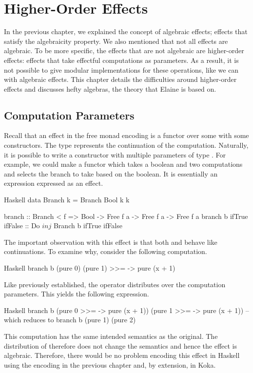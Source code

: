 \chapter{Higher-Order Effects}\label{chap:higher_order}

In the previous chapter, we explained the concept of algebraic effects; effects that satisfy the algebraicity property. We also mentioned that not all effects are algebraic. To be more specific, the effects that are not algebraic are higher-order effects: effects that take effectful computations as parameters. As a result, it is not possible to give modular implementations for these operations, like we can with algebraic effects. This chapter details the difficulties around higher-order effects and discusses hefty algebras, the theory that Elaine is based on.


\section{Computation Parameters}

Recall that an effect in the free monad encoding is a functor over some  with some constructors. The type  represents the continuation of the computation. Naturally, it is possible to write a constructor with multiple parameters of type . For example, we could make a  functor which takes a boolean and two computations and selects the branch to take based on the boolean. It is essentially an  expression expressed as an effect.

\begin{lst}{Haskell}
data Branch k = Branch Bool k k

branch :: Branch < f => Bool -> Free f a -> Free f a -> Free f a
branch b ifTrue ifFalse :: Do $ inj $ Branch b ifTrue ifFalse
\end{lst}
%
The important observation with this effect is that both  and  behave like continuations. To examine why, consider the following computation.

\begin{lst}{Haskell}
branch b (pure 0) (pure 1) >>= \x -> pure (x + 1)
\end{lst}
%
Like previously established, the \hs{>>=} operator distributes over the computation parameters. This yields the following expression.

\begin{lst}{Haskell}
branch b
  (pure 0 >>= \x -> pure (x + 1))
  (pure 1 >>= \x -> pure (x + 1))
-- which reduces to
branch b (pure 1) (pure 2)
\end{lst}
%
This computation has the same intended semantics as the original. The distribution of \hs{>>=} therefore does not change the semantics and hence the effect is algebraic. Therefore, there would be no problem encoding this effect in Haskell using the encoding in the previous chapter and, by extension, in Koka.

